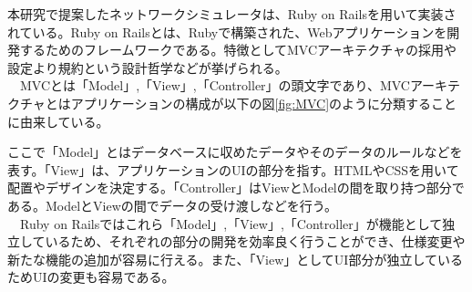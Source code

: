 \label{tag:rails}
本研究で提案したネットワークシミュレータは、Ruby on Railsを用いて実装されている。Ruby on Railsとは、Rubyで構築された、Webアプリケーションを開発するためのフレームワークである。特徴としてMVCアーキテクチャの採用や設定より規約という設計哲学などが挙げられる。\\
　MVCとは「Model」,「View」,「Controller」の頭文字であり、MVCアーキテクチャとはアプリケーションの構成が以下の図\ref{fig:MVC}のように分類することに由来している。


ここで「Model」とはデータベースに収めたデータやそのデータのルールなどを表す。「View」は、アプリケーションのUIの部分を指す。HTMLやCSSを用いて配置やデザインを決定する。「Controller」はViewとModelの間を取り持つ部分である。ModelとViewの間でデータの受け渡しなどを行う。\\
　Ruby on Railsではこれら「Model」,「View」,「Controller」が機能として独立しているため、それぞれの部分の開発を効率良く行うことができ、仕様変更や新たな機能の追加が容易に行える。また、「View」としてUI部分が独立しているためUIの変更も容易である。
